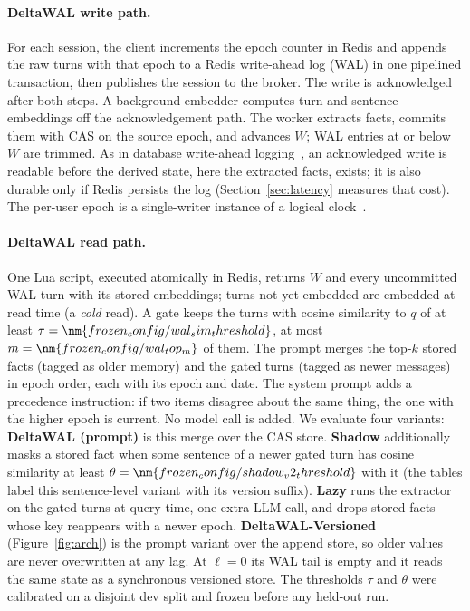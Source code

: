\paragraph{DeltaWAL write path.}
For each session, the client increments the epoch counter in Redis and appends the raw turns with that epoch to a Redis write-ahead log (WAL) in one pipelined transaction, then publishes the session to the broker. The write is acknowledged after both steps. A background embedder computes turn and sentence embeddings off the acknowledgement path. The worker extracts facts, commits them with CAS on the source epoch, and advances $W$; WAL entries at or below $W$ are trimmed. As in database write-ahead logging~\citep{mohan1992aries}, an acknowledged write is readable before the derived state, here the extracted facts, exists; it is also durable only if Redis persists the log (Section~\ref{sec:latency} measures that cost). The per-user epoch is a single-writer instance of a logical clock~\citep{lamport1978time}.

\paragraph{DeltaWAL read path.}
One Lua script, executed atomically in Redis, returns $W$ and every uncommitted WAL turn with its stored embeddings; turns not yet embedded are embedded at read time (a \emph{cold} read). A gate keeps the turns with cosine similarity to $q$ of at least $\tau=\nm{frozen_config/wal_sim_threshold}$, at most $m=\nm{frozen_config/wal_top_m}$ of them. The prompt merges the top-$k$ stored facts (tagged as older memory) and the gated turns (tagged as newer messages) in epoch order, each with its epoch and date. The system prompt adds a precedence instruction: if two items disagree about the same thing, the one with the higher epoch is current. No model call is added. We evaluate four variants:
\textbf{DeltaWAL (prompt)} is this merge over the CAS store.
\textbf{Shadow} additionally masks a stored fact when some sentence of a newer gated turn has cosine similarity at least $\theta=\nm{frozen_config/shadow_v2_threshold}$ with it (the tables label this sentence-level variant with its version suffix).
\textbf{Lazy} runs the extractor on the gated turns at query time, one extra LLM call, and drops stored facts whose key reappears with a newer epoch.
\textbf{DeltaWAL-Versioned} (Figure~\ref{fig:arch}) is the prompt variant over the append store, so older values are never overwritten at any lag. At $\ell=0$ its WAL tail is empty and it reads the same state as a synchronous versioned store.
The thresholds $\tau$ and $\theta$ were calibrated on a disjoint dev split and frozen before any held-out run.
